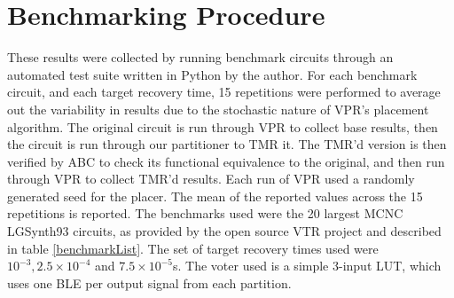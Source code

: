 \documentclass[12pt,final,oneside]{dwThesis} %
\begin{document}
   \section{Benchmarking Procedure}
   These results were
   collected by running benchmark circuits through an automated test suite
   written in Python by the author. For each benchmark circuit, and each target
   recovery time, 15 repetitions were performed to average out the variability
   in results due to the stochastic nature of \gls{VPR}'s placement algorithm.
   The original circuit is run through VPR to collect base results, then the
   circuit is run through our partitioner to TMR it. The TMR'd version is then
   verified by \gls{ABC} to check its functional equivalence to the original,
   and then run through VPR to collect TMR'd results. Each run of VPR used a
   randomly generated seed for the placer.  The mean of the reported values
   across the 15 repetitions is reported.  The benchmarks used were the 20
   largest \gls{MCNC} LGSynth93 circuits, as provided by the open source
   \gls{VTR} project  and described in table
   \ref{benchmarkList}.  The set of target recovery times used were $10^{-3},
   2.5\times10^{-4}$ and $7.5\times10^{-5}$s.  The voter used is a simple
   3-input \gls{LUT}, which uses one \gls{BLE} per output signal from each
   partition.
\end{document}
